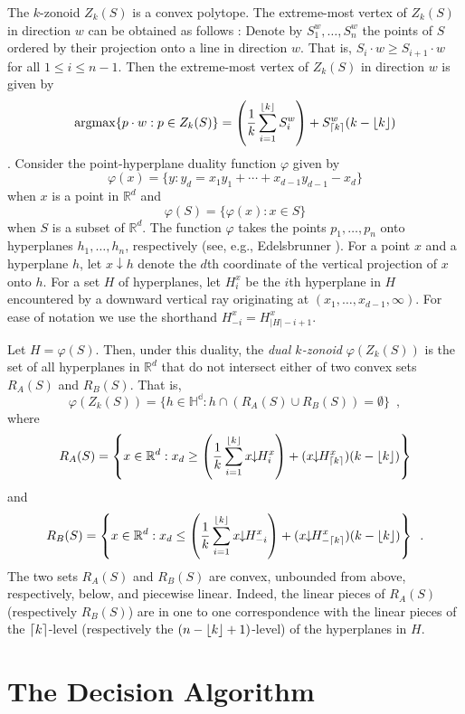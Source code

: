\documentclass[lotsofwhite]{patmorin}
\newcommand{\argmax}{\mathrm{argmax}}
\newcommand{\drop}{\!\!\downarrow\!\!}
\newcommand{\dual}{\varphi}
\begin{document}
The $k$-zonoid $Z_k(S)$ is a convex polytope.  The extreme-most vertex
of $Z_k(S)$ in direction $w$ can be obtained as follows
\cite{gmXX,beXX}:  Denote by $S_1^w,\ldots,S_n^w$ the points of $S$
ordered by their projection onto a line in direction $w$.  That is,
$S_i\cdot w \ge S_{i+1}\cdot w$ for all $1\le i\le n-1$.  Then the
extreme-most vertex of $Z_k(S)$ in direction $w$ is given by 
\[  
\argmax\{p\cdot w: p\in Z_k(S)\} =
        \left(\frac{1}{k}\sum_{i=1}^{\floor{k}} S_i^w\right) +
          S_{\ceil{k}}^w(k-\floor{k})
\]
\cite{beXX,gmXX}.
Consider the point-hyperplane duality function
$\dual$ given by 
\[
    \dual(x)=\{y : y_d = x_1y_1 +\cdots +x_{d-1}y_{d-1} - x_d \}
\] 
when $x$ is a point in $\mathbb{R}^d$ and
\[
     \dual(S) = \{\dual(x) : x\in S\}
\]
when $S$ is a subset of $\mathbb{R}^d$.  The function $\dual$ takes
the points $p_1,\ldots,p_n$ onto hyperplanes $h_1,\ldots,h_n$,
respectively (see, e.g., Edelsbrunner \cite{eXX}).  For a point $x$
and a hyperplane $h$, let $x\drop h$ denote the $d$th coordinate of
the vertical projection of $x$ onto $h$.  For a set $H$ of
hyperplanes, let $H_i^x$ be the $i$th hyperplane in $H$ encountered by
a downward vertical ray originating at $(x_1,\ldots,x_{d-1},\infty)$.
For ease of notation we use the shorthand $H_{-i}^x=H_{|H|-i+1}^x$.

Let $H=\dual(S)$.  Then,
under this duality, the \emph{dual $k$-zonoid} $\dual(Z_k(S))$ is the set 
of all hyperplanes in $\mathbb{R}^d$
that do not intersect either of two convex sets $R_A(S)$ and $R_B(S)$.
That is,
\[
     \dual(Z_k(S)) = \{ h\in\mathbb{H^d} : h\cap(R_A(S)\cup R_B(S)) = \emptyset \} \enspace ,
\]
where
\[
   R_A(S) = \left\{x\in\mathbb{R}^d: x_d \ge 
\left(\frac{1}{k}\sum_{i=1}^{\floor{k}} x\drop H_i^x\right) +
          (x\drop H_{\ceil{k}}^x)(k-\floor{k}) \right\}  \eqlabel{ra}
\] 
and
\[
   R_B(S) = \left\{x\in\mathbb{R}^d: x_d \le 
\left(\frac{1}{k}\sum_{i=1}^{\floor{k}} x\drop H_{-i}^x\right) +
          (x\drop H_{-\ceil{k}}^x)(k-\floor{k}) \right\} \enspace .
\] 
The two sets $R_A(S)$ and $R_B(S)$ are convex, unbounded from above,
respectively, below, and piecewise linear.  Indeed, the linear pieces
of $R_A(S)$ (respectively $R_B(S)$) are in one to one correspondence
with the linear pieces of the $\left\lceil k \right\rceil$-level (respectively
the $(n-\left\lfloor k \right\rfloor+1)$-level) of the hyperplanes in $H$.


\section{The Decision Algorithm}
\end{document}
